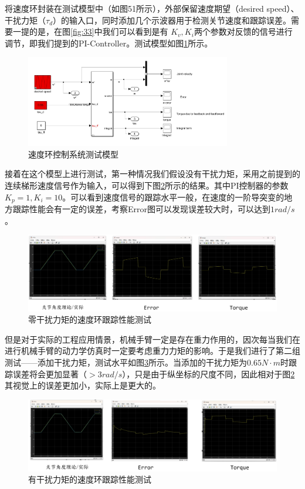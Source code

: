 将速度环封装在测试模型中（如图51所示），外部保留速度期望（desired speed）、干扰力矩（$\tau_d$）的输入口，同时添加几个示波器用于检测关节速度和跟踪误差。需要一提的是，在图\ref{fig:33}中我们可以看到是有 $K_v,K_i$两个参数对反馈的信号进行调节，即我们提到的PI-Controller。测试模型如图\ref{fig:34}所示。

\begin{figure}[htbp]
    \centering
    \includegraphics[width=0.8\textwidth]{Image/vloop_test.png}
    \caption{速度环控制系统测试模型}
    \label{fig:34}
\end{figure}

接着在这个模型上进行测试，第一种情况我们假设没有干扰力矩，采用之前提到的连续梯形速度信号作为输入，可以得到下图\ref{fig:35}所示的结果。其中PI控制器的参数$K_p=1,K_i=10$。可以看到速度信号的跟踪水平一般，在速度的一阶导突变的地方跟踪性能会有一定的误差，考察Error图可以发现误差较大时，可以达到$1rad/s$。

\begin{figure}[htbp]
    \centering
    \includegraphics[width=\textwidth]{Image/fig40.png}
    \caption{零干扰力矩的速度环跟踪性能测试}
    \label{fig:35}
\end{figure}

但是对于实际的工程应用情景，机械手臂一定是存在重力作用的，因次每当我们在进行机械手臂的动力学仿真时一定要考虑重力力矩的影响。于是我们进行了第二组测试——添加干扰力矩，测试水平如图\ref{fig:36}所示。当添加的干扰力矩为$0.65N\cdot m$时跟踪误差将会更加显著（$>3rad/s$），只是由于纵坐标的尺度不同，因此相对于图\ref{fig:35}其视觉上的误差更加小，实际上是更大的。

\begin{figure}[htbp]
    \centering
    \includegraphics[width=\textwidth]{Image/fig41.png}
    \caption{有干扰力矩的速度环跟踪性能测试}
    \label{fig:36}
\end{figure}

